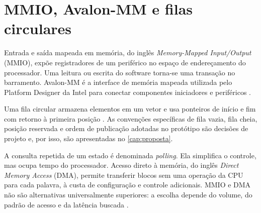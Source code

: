 \section{MMIO, Avalon-MM e filas circulares}\label{sec:mmio}

Entrada e saída mapeada em memória, do inglês \textit{Memory-Mapped Input/Output} (MMIO), expõe registradores de um periférico no espaço de endereçamento do processador. Uma leitura ou escrita do software torna-se uma transação no barramento. Avalon-MM é a interface de memória mapeada utilizada pelo Platform Designer da Intel para conectar componentes iniciadores e periféricos \cite{IntelAvalon,IntelPlatformDesigner}.

Uma fila circular armazena elementos em um vetor e usa ponteiros de início e fim com retorno à primeira posição \cite{Cormen2022}. As convenções específicas de fila vazia, fila cheia, posição reservada e ordem de publicação adotadas no protótipo são decisões de projeto e, por isso, são apresentadas no \autoref{cap:proposta}.

A consulta repetida de um estado é denominada \textit{polling}. Ela simplifica o controle, mas ocupa tempo do processador. Acesso direto à memória, do inglês \textit{Direct Memory Access} (DMA), permite transferir blocos sem uma operação da CPU para cada palavra, à custa de configuração e controle adicionais. MMIO e DMA não são alternativas universalmente superiores: a escolha depende do volume, do padrão de acesso e da latência buscada \cite{IntelSoCFPGADesignGuidelines,IntelSoCDMA2019}.
